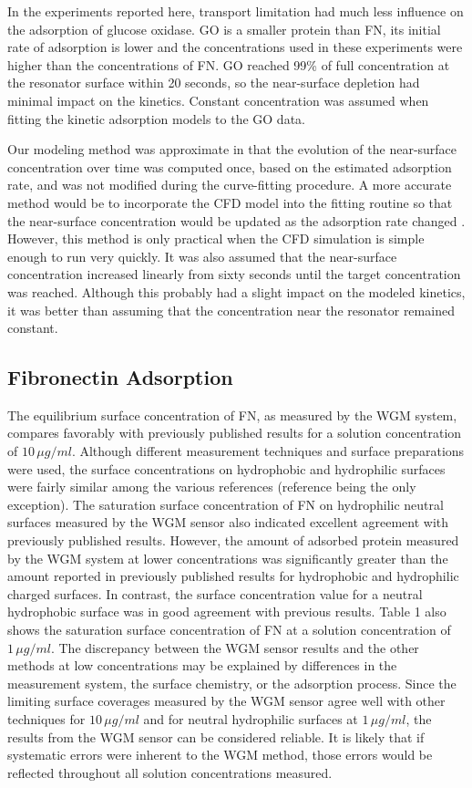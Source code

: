 In the experiments reported here, transport limitation had much less
influence on the adsorption of glucose oxidase. GO is a smaller protein
than FN, its initial rate of adsorption is lower and the concentrations
used in these experiments were higher than the concentrations of FN.
GO reached 99\% of full concentration at the resonator surface within
20 seconds, so the near-surface depletion had minimal impact on the
kinetics. Constant concentration was assumed when fitting the kinetic
adsorption models to the GO data.

Our modeling method was approximate in that the evolution of the near-surface
concentration over time was computed once, based on the estimated
adsorption rate, and was not modified during the curve-fitting procedure.
A more accurate method would be to incorporate the CFD model into
the fitting routine so that the near-surface concentration would be
updated as the adsorption rate changed \cite{Jenkins2004}. However,
this method is only practical when the CFD simulation is simple enough
to run very quickly. It was also assumed that the near-surface concentration
increased linearly from sixty seconds until the target concentration
was reached. Although this probably had a slight impact on the modeled
kinetics, it was better than assuming that the concentration near
the resonator remained constant.


\subsection{Fibronectin Adsorption}

The equilibrium surface concentration of FN, as measured by the WGM
system, compares favorably with previously published results for a
solution concentration of $10\,\mu g/ml$. Although different measurement
techniques and surface preparations were used, the surface concentrations
on hydrophobic and hydrophilic surfaces were fairly similar among
the various references (reference \cite{Lee2006} being the only exception).
The saturation surface concentration of FN on hydrophilic neutral
surfaces measured by the WGM sensor also indicated excellent agreement
with previously published results. However, the amount of adsorbed
protein measured by the WGM system at lower concentrations was significantly
greater than the amount reported in previously published results for
hydrophobic and hydrophilic charged surfaces. In contrast, the surface
concentration value for a neutral hydrophobic surface was in good
agreement with previous results. Table 1 also shows the saturation
surface concentration of FN at a solution concentration of $1\,\mu g/ml$.
The discrepancy between the WGM sensor results and the other methods
at low concentrations may be explained by differences in the measurement
system, the surface chemistry, or the adsorption process. Since the
limiting surface coverages measured by the WGM sensor agree well with
other techniques for $10\,\mu g/ml$ and for neutral hydrophilic surfaces
at $1\,\mu g/ml$, the results from the WGM sensor can be considered
reliable. It is likely that if systematic errors were inherent to
the WGM method, those errors would be reflected throughout all solution
concentrations measured. 

